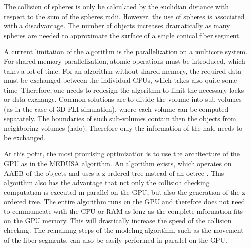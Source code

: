 The collision of spheres is only be calculated by the euclidian distance with respect to the sum of the spheres radii.
However, the use of spheres is associated with a disadvantage.
The number of objects increases dramatically as many spheres are needed to approximate the surface of a single conical fiber segment.
\par
% 
A current limitation of the algorithm is the parallelization on a multicore system.
For shared memory parallelization, atomic operations must be introduced, which takes a lot of time.
For an algorithm without shared memory, the required data must be exchanged between the individual CPUs, which takes also quite some time. 
Therefore, one needs to redesign the algorithm to limit the necessary locks or data exchange.
Common solutions are to divide the volume into sub-volumes (as in the case of \ac{3D-PLI} simulation), where each volume can be computed separately.
The boundaries of such sub-volumes contain then the objects from neighboring volumes (halo).
Therefore only the information of the halo needs to be exchanged.
\par
% 
At this point, the most promising optimization is to use the architecture of the \ac{GPU} as \eg{} in the \ac{MEDUSA} algorithm.
An algorithm exists, which operates on \ac{AABB} of the objects and uses a z-ordered tree instead of an octree \cite{Karras2012}.
This algorithm also has the advantage that not only the collision checking computation is executed in parallel on the \ac{GPU}, but also the generation of the z-ordered tree.
The entire algorithm runs on the \ac{GPU} and therefore does not need to communicate with the \ac{CPU} or \ac{RAM} as long as the complete information fits on the \ac{GPU} memory.
This will drastically increase the speed of the collision checking.
The remaining steps of the modeling algorithm, such as the movement of the fiber segments, can also be easily performed in parallel on the \ac{GPU}.
% 
% 
% 
